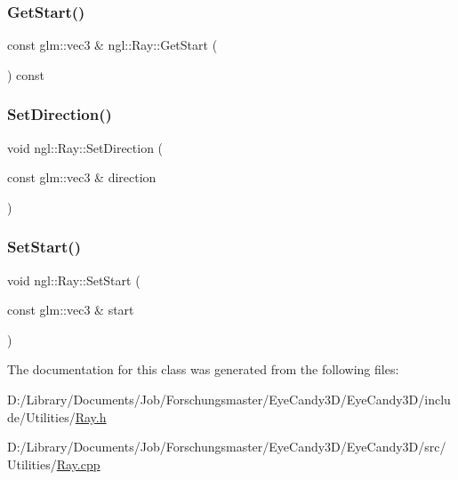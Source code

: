 \mbox{\label{classngl_1_1_ray_ad981f9e5a16d05f42894fba9513a5fcd}} 
\subsubsection{\texorpdfstring{Get\+Start()}{GetStart()}}
{\footnotesize\ttfamily const glm\+::vec3 \& ngl\+::\+Ray\+::\+Get\+Start (\begin{DoxyParamCaption}{ }\end{DoxyParamCaption}) const}

\mbox{\label{classngl_1_1_ray_aec6e9aacc41803389e39fa585ad82cde}} 
\subsubsection{\texorpdfstring{Set\+Direction()}{SetDirection()}}
{\footnotesize\ttfamily void ngl\+::\+Ray\+::\+Set\+Direction (\begin{DoxyParamCaption}\item[{const glm\+::vec3 \&}]{direction }\end{DoxyParamCaption})}

\mbox{\label{classngl_1_1_ray_a692e697cfb4eea3cb43bee9fb99efa52}} 
\subsubsection{\texorpdfstring{Set\+Start()}{SetStart()}}
{\footnotesize\ttfamily void ngl\+::\+Ray\+::\+Set\+Start (\begin{DoxyParamCaption}\item[{const glm\+::vec3 \&}]{start }\end{DoxyParamCaption})}



The documentation for this class was generated from the following files\+:\begin{DoxyCompactItemize}
\item 
D\+:/\+Library/\+Documents/\+Job/\+Forschungsmaster/\+Eye\+Candy3\+D/\+Eye\+Candy3\+D/include/\+Utilities/\mbox{\hyperlink{_ray_8h}{Ray.\+h}}\item 
D\+:/\+Library/\+Documents/\+Job/\+Forschungsmaster/\+Eye\+Candy3\+D/\+Eye\+Candy3\+D/src/\+Utilities/\mbox{\hyperlink{_ray_8cpp}{Ray.\+cpp}}\end{DoxyCompactItemize}
